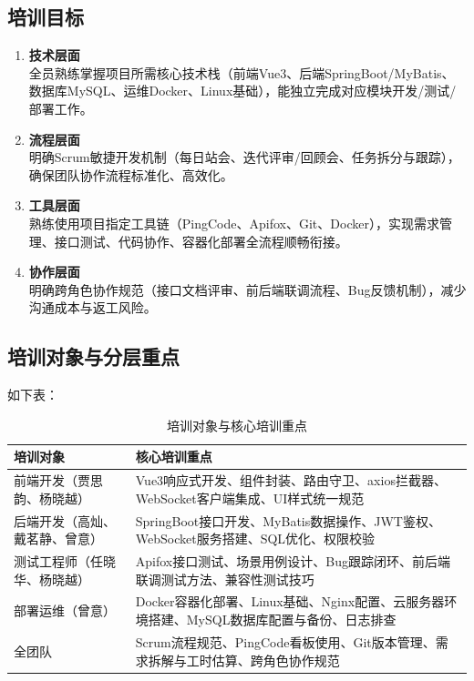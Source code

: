 \subsection{培训目标}
\begin{enumerate}
    \item \textbf{技术层面} \\
          全员熟练掌握项目所需核心技术栈（前端Vue3、后端SpringBoot/MyBatis、数据库MySQL、运维Docker、Linux基础），能独立完成对应模块开发/测试/部署工作。

    \item \textbf{流程层面} \\
          明确Scrum敏捷开发机制（每日站会、迭代评审/回顾会、任务拆分与跟踪），确保团队协作流程标准化、高效化。

    \item \textbf{工具层面} \\
          熟练使用项目指定工具链（PingCode、Apifox、Git、Docker），实现需求管理、接口测试、代码协作、容器化部署全流程顺畅衔接。

    \item \textbf{协作层面} \\
          明确跨角色协作规范（接口文档评审、前后端联调流程、Bug反馈机制），减少沟通成本与返工风险。

\end{enumerate}


\subsection{培训对象与分层重点}
如下表：
\begin{table}[H]
    \centering
    \renewcommand{\arraystretch}{1.2}  %
    \caption{培训对象与核心培训重点}
    \begin{tabularx}{\textwidth}{@{}>{\centering\arraybackslash}p{4cm}>{\centering\arraybackslash}X@{}}
        \toprule
        \textbf{培训对象}   & \textbf{核心培训重点}                                           \\
        \midrule
        前端开发（贾思韵、杨晓越）   & Vue3响应式开发、组件封装、路由守卫、axios拦截器、WebSocket客户端集成、UI样式统一规范      \\
        后端开发（高灿、戴茗静、曾意） & SpringBoot接口开发、MyBatis数据操作、JWT鉴权、WebSocket服务搭建、SQL优化、权限校验 \\
        测试工程师（任晓华、杨晓越）  & Apifox接口测试、场景用例设计、Bug跟踪闭环、前后端联调测试方法、兼容性测试技巧               \\
        部署运维（曾意）        & Docker容器化部署、Linux基础、Nginx配置、云服务器环境搭建、MySQL数据库配置与备份、日志排查   \\
        全团队             & Scrum流程规范、PingCode看板使用、Git版本管理、需求拆解与工时估算、跨角色协作规范          \\
        \bottomrule
    \end{tabularx}
\end{table}

